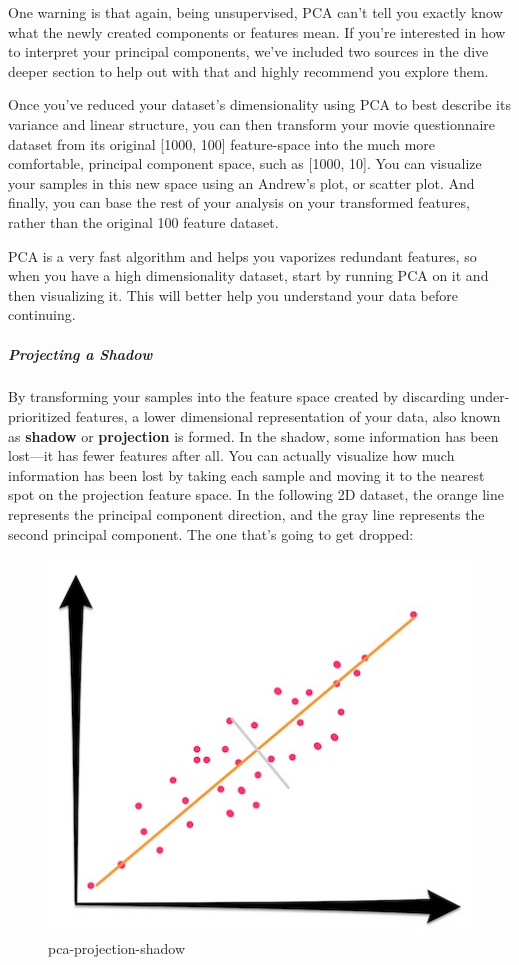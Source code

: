 \documentclass[11pt]{article}
\makeatletter
\def\maxwidth{\ifdim\Gin@nat@width>\linewidth\linewidth
    \else\Gin@nat@width\fi}
\let\Oldincludegraphics\includegraphics
\renewcommand{\includegraphics}[1]{\Oldincludegraphics[width=.8\maxwidth]{#1}}
\makeatother
\begin{document}
One warning is that again, being unsupervised, PCA can't tell you
exactly know what the newly created components or features mean. If
you're interested in how to interpret your principal components, we've
included two sources in the dive deeper section to help out with that
and highly recommend you explore them.

Once you've reduced your dataset's dimensionality using PCA to best
describe its variance and linear structure, you can then transform your
movie questionnaire dataset from its original {[}1000, 100{]}
feature-space into the much more comfortable, principal component space,
such as {[}1000, 10{]}. You can visualize your samples in this new space
using an Andrew's plot, or scatter plot. And finally, you can base the
rest of your analysis on your transformed features, rather than the
original 100 feature dataset.

PCA is a very fast algorithm and helps you vaporizes redundant features,
so when you have a high dimensionality dataset, start by running PCA on
it and then visualizing it. This will better help you understand your
data before continuing.

\subparagraph{Projecting a Shadow}\label{projecting-a-shadow}

By transforming your samples into the feature space created by
discarding under-prioritized features, a lower dimensional
representation of your data, also known as \textbf{shadow} or
\textbf{projection} is formed. In the shadow, some information has been
lost---it has fewer features after all. You can actually visualize how
much information has been lost by taking each sample and moving it to
the nearest spot on the projection feature space. In the following 2D
dataset, the orange line represents the principal component direction,
and the gray line represents the second principal component. The one
that's going to get dropped:

\begin{figure}
\centering
\includegraphics{pic/pca-projection-shadow.png}
\caption{pca-projection-shadow}
\end{figure}
\end{document}
